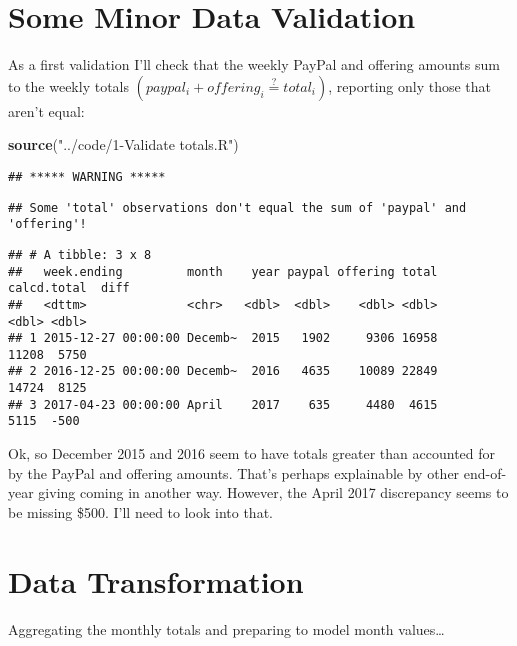 \documentclass[]{article}
\newenvironment{Shaded}{\begin{snugshade}}{\end{snugshade}}
\newcommand{\KeywordTok}[1]{\textcolor[rgb]{0.13,0.29,0.53}{\textbf{#1}}}
\newcommand{\NormalTok}[1]{#1}
\newcommand{\StringTok}[1]{\textcolor[rgb]{0.31,0.60,0.02}{#1}}
\begin{document}
\hypertarget{some-minor-data-validation}{%
\section{Some Minor Data Validation}\label{some-minor-data-validation}}

As a first validation I'll check that the weekly PayPal and offering
amounts sum to the weekly totals
\((paypal_i+{offering}_i\overset{?}=total_i)\), reporting only those
that aren't equal:

\begin{Shaded}
\begin{Highlighting}[]
\KeywordTok{source}\NormalTok{(}\StringTok{"../code/1-Validate totals.R"}\NormalTok{)}
\end{Highlighting}
\end{Shaded}

\begin{verbatim}
## ***** WARNING *****
\end{verbatim}

\begin{verbatim}
## Some 'total' observations don't equal the sum of 'paypal' and 'offering'!
\end{verbatim}

\begin{verbatim}
## # A tibble: 3 x 8
##   week.ending         month    year paypal offering total calcd.total  diff
##   <dttm>              <chr>   <dbl>  <dbl>    <dbl> <dbl>       <dbl> <dbl>
## 1 2015-12-27 00:00:00 Decemb~  2015   1902     9306 16958       11208  5750
## 2 2016-12-25 00:00:00 Decemb~  2016   4635    10089 22849       14724  8125
## 3 2017-04-23 00:00:00 April    2017    635     4480  4615        5115  -500
\end{verbatim}

Ok, so December 2015 and 2016 seem to have totals greater than accounted
for by the PayPal and offering amounts. That's perhaps explainable by
other end-of-year giving coming in another way. However, the April 2017
discrepancy seems to be missing \$500. I'll need to look into that.

\hypertarget{data-transformation}{%
\section{Data Transformation}\label{data-transformation}}

Aggregating the monthly totals and preparing to model month
values\ldots{}
\end{document}
